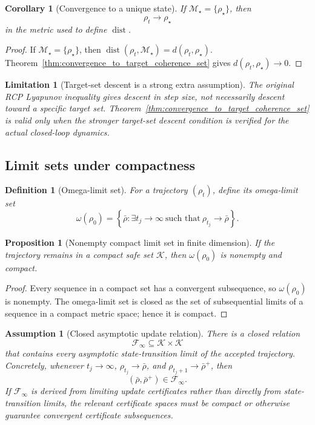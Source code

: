 \documentclass[11pt]{article}
\newtheorem{proposition}[theorem]{Proposition}
\newtheorem{corollary}[theorem]{Corollary}
\newtheorem{definition}[theorem]{Definition}
\newtheorem{assumption}[theorem]{Assumption}
\newtheorem{limitation}[theorem]{Limitation}
\newcommand{\Fcal}{\mathcal{F}}
\newcommand{\1}{\mathbf{1}}
\providecommand{\Kcal}{\mathcal{K}}
\providecommand{\Mcal}{\mathcal{M}}
\providecommand{\dist}{\operatorname{dist}}
\begin{document}
\begin{corollary}[Convergence to a unique state]
\label{cor:convergence_unique_state}
If \(\Mcal_\star=\{\rho_\star\}\), then
\[
\rho_t\to\rho_\star
\]
in the metric used to define \(\dist\).
\end{corollary}

\begin{proof}
If \(\Mcal_\star=\{\rho_\star\}\), then \(\dist(\rho_t,\Mcal_\star)=d(\rho_t,\rho_\star)\).  Theorem~\ref{thm:convergence_to_target_coherence_set} gives \(d(\rho_t,\rho_\star)\to0\).
\end{proof}

\begin{limitation}[Target-set descent is a strong extra assumption]
The original RCP Lyapunov inequality gives descent in step size, not necessarily descent toward a specific target set.  Theorem~\ref{thm:convergence_to_target_coherence_set} is valid only when the stronger target-set descent condition is verified for the actual closed-loop dynamics.
\end{limitation}

\subsection{Limit sets under compactness}

\begin{definition}[Omega-limit set]
\label{def:omega_limit_set}
For a trajectory \((\rho_t)\), define its omega-limit set
\[
\omega(\rho_0)
=
\left\{
\bar\rho:
\exists t_j\to\infty\ \text{such that}\ \rho_{t_j}\to\bar\rho
\right\}.
\]
\end{definition}

\begin{proposition}[Nonempty compact limit set in finite dimension]
\label{prop:nonempty_compact_limit_set}
If the trajectory remains in a compact safe set \(\Kcal\), then \(\omega(\rho_0)\) is nonempty and compact.
\end{proposition}

\begin{proof}
Every sequence in a compact set has a convergent subsequence, so \(\omega(\rho_0)\) is nonempty.  The omega-limit set is closed as the set of subsequential limits of a sequence in a compact metric space; hence it is compact.
\end{proof}

\begin{assumption}[Closed asymptotic update relation]
\label{ass:closed_asymptotic_update_relation}
There is a closed relation
\[
\Fcal_\infty\subseteq\Kcal\times\Kcal
\]
that contains every asymptotic state-transition limit of the accepted trajectory.  Concretely, whenever \(t_j\to\infty\), \(\rho_{t_j}\to\bar\rho\), and \(\rho_{t_j+1}\to\bar\rho^+\), then
\[
(\bar\rho,\bar\rho^+)\in\Fcal_\infty.
\]
If \(\Fcal_\infty\) is derived from limiting update certificates rather than directly from state-transition limits, the relevant certificate spaces must be compact or otherwise guarantee convergent certificate subsequences.
\end{assumption}
\end{document}
